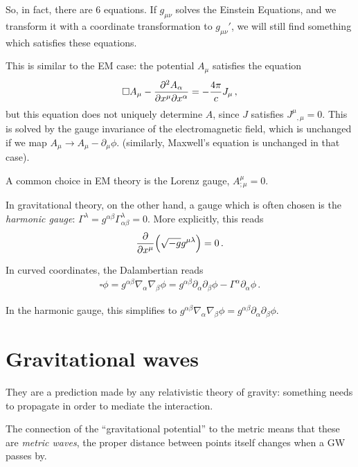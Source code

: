 \documentclass[main.tex]{subfiles}
\begin{document}
So, in fact, there are 6 equations. 
If \(g_{\mu \nu }\) solves the Einstein Equations, and we transform it with a coordinate transformation to \(g_{\mu \nu }'\), we will still find something which satisfies these equations. 

This is similar to the EM case: the potential \(A_{\mu }\) satisfies the equation 
%
\begin{align}
\square A_{\mu } - \pdv{A_{\alpha }}{x^{\mu }}{x^{\alpha }} = - \frac{4 \pi }{c} J_\mu 
\,,
\end{align}
%
but this equation does not uniquely determine \(A\), since \(J\) satisfies \(J^{\mu }{}_{, \mu } = 0\). 
This is solved by the gauge invariance of the electromagnetic field, which is unchanged if we map \(A_{\mu } \to A_{\mu } - \partial_{\mu } \phi \). 
(similarly, Maxwell's equation is unchanged in that case).

A common choice in EM theory is the Lorenz gauge, \(A^{\mu }_{; \mu }= 0\). 

In gravitational theory, on the other hand, a gauge which  is often chosen is the \emph{harmonic gauge}: \(\Gamma^{\lambda } = g^{\alpha \beta } \Gamma^{\lambda }_{\alpha \beta } = 0\). More explicitly, this reads 
%
\begin{align}
\pdv{}{x^{\mu }} \qty(\sqrt{-g} g^{\mu \lambda }) = 0 
\,.
\end{align}

In curved coordinates, the Dalambertian reads 
%
\begin{align}
\square \phi = g^{\alpha \beta } \nabla_\alpha \nabla_\beta \phi = g^{\alpha \beta } \partial_{\alpha } \partial_{\beta } \phi - \Gamma^{\alpha } \partial_{\alpha } \phi 
\,.
\end{align}

In the harmonic gauge, this simplifies to \(g^{\alpha \beta } \nabla_\alpha \nabla_\beta \phi  = g^{\alpha \beta } \partial_{\alpha } \partial_{\beta } \phi \). 

\section{Gravitational waves}

They are a prediction made by any relativistic theory of gravity: something needs to propagate in order to mediate the interaction. 

The connection of the ``gravitational potential'' to the metric means that these are \emph{metric waves}, the proper distance between points itself changes when a GW passes by. 
\end{document}
